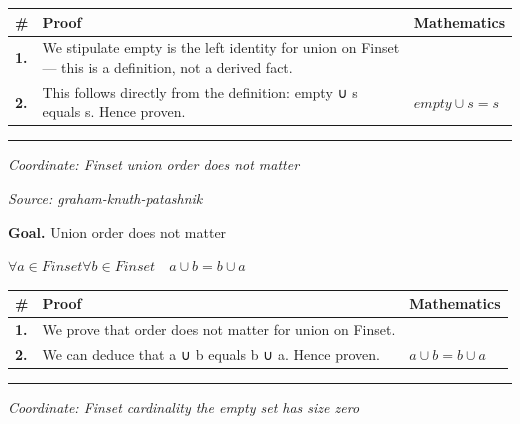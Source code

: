 \documentclass[11pt]{article}
\theoremstyle{definition}
\begin{document}
\noindent
\begin{tabular}{@{} >{\raggedright\arraybackslash}p{} >{\raggedright\arraybackslash}p{} >{\raggedleft\arraybackslash}p{} @{}}
\textbf{\#} & \textbf{Proof} & \textbf{Mathematics} \\
\midrule
\textbf{1.} & We stipulate empty is the left identity for union on Finset — this is a definition, not a derived fact. & \\[0.45em]
\textbf{2.} & This follows directly from the definition: empty ∪ s equals s. Hence proven. & $\displaystyle empty ∪ s = s$ \\[0.45em]
\bottomrule
\end{tabular}
\label{thm:Finset-union-empty_is_the_left_identity}
\par\medskip\hrule
\bigskip
{}\par
\smallskip\noindent\textit{Coordinate: Finset \cdot union \cdot order does not matter}\par
\smallskip\noindent\textit{Source: graham-knuth-patashnik}\par
\medskip
\noindent\textbf{Goal.} Union order does not matter\par
\noindent$\displaystyle \forall a \in Finset \forall b \in Finset\quad a ∪ b = b ∪ a$\par
\medskip
\noindent
\begin{tabular}{@{} >{\raggedright\arraybackslash}p{} >{\raggedright\arraybackslash}p{} >{\raggedleft\arraybackslash}p{} @{}}
\textbf{\#} & \textbf{Proof} & \textbf{Mathematics} \\
\midrule
\textbf{1.} & We prove that order does not matter for union on Finset. & \\[0.45em]
\textbf{2.} & We can deduce that a ∪ b equals b ∪ a. Hence proven. & $\displaystyle a ∪ b = b ∪ a$ \\[0.45em]
\bottomrule
\end{tabular}
\label{thm:Finset-union-order_does_not_matter}
\par\medskip\hrule
\bigskip
{}\par
\smallskip\noindent\textit{Coordinate: Finset \cdot cardinality \cdot the empty set has size zero}\par
\end{document}
